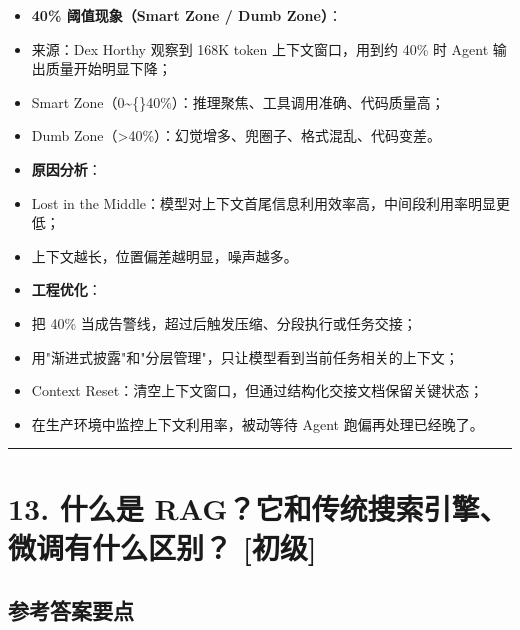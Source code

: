 \documentclass[9pt,a4paper,twocolumn]{ctexart}
\newcommand{\lvchu}{\usebox{\badgechubox}}
\def\lvchu{[初级]}%
\begin{document}
\begin{itemize}[itemsep=1pt, topsep=2pt]
  \item \textbf{40\% 阈值现象（Smart Zone / Dumb Zone）}：
  \item 来源：Dex Horthy 观察到 168K token 上下文窗口，用到约 40\% 时 Agent 输出质量开始明显下降；
  \item Smart Zone（0\textasciitilde\{\}40\%）：推理聚焦、工具调用准确、代码质量高；
  \item Dumb Zone（>40\%）：幻觉增多、兜圈子、格式混乱、代码变差。
  \item \textbf{原因分析}：
  \item Lost in the Middle：模型对上下文首尾信息利用效率高，中间段利用率明显更低；
  \item 上下文越长，位置偏差越明显，噪声越多。
  \item \textbf{工程优化}：
  \item 把 40\% 当成告警线，超过后触发压缩、分段执行或任务交接；
  \item 用"渐进式披露"和"分层管理"，只让模型看到当前任务相关的上下文；
  \item Context Reset：清空上下文窗口，但通过结构化交接文档保留关键状态；
  \item 在生产环境中监控上下文利用率，被动等待 Agent 跑偏再处理已经晚了。
\end{itemize}


\vspace{2pt}
\noindent\rule{\columnwidth}{0.3pt}\vspace{2pt}





\section*{13. 什么是 RAG？它和传统搜索引擎、微调有什么区别？ \lvchu{}}


\subsection*{参考答案要点}
\end{document}
